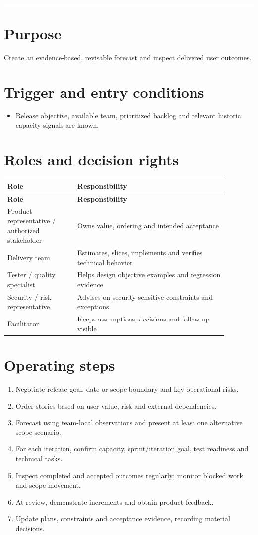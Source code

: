 \documentclass[11pt,letterpaper]{article}
\begin{document}
\tableofcontents\medskip\noindent\rule{\linewidth}{0.4pt}\medskip
\section{Purpose}
Create an evidence-based, revisable forecast and inspect delivered user outcomes.

\section{Trigger and entry conditions}
\begin{itemize}[leftmargin=*,itemsep=2pt]
\item Release objective, available team, prioritized backlog and relevant historic capacity signals are known.
\end{itemize}
\section{Roles and decision rights}
\begin{longtable}{|p{0.28\linewidth}|p{0.60\linewidth}|}\hline
\textbf{Role} & \textbf{Responsibility} \\ \hline\endfirsthead\hline
\textbf{Role} & \textbf{Responsibility} \\ \hline\endhead
Product representative / authorized stakeholder & Owns value, ordering and intended acceptance \\ \hline
Delivery team & Estimates, slices, implements and verifies technical behavior \\ \hline
Tester / quality specialist & Helps design objective examples and regression evidence \\ \hline
Security / risk representative & Advises on security-sensitive constraints and exceptions \\ \hline
Facilitator & Keeps assumptions, decisions and follow-up visible \\ \hline
\end{longtable}
\section{Operating steps}
\begin{enumerate}[leftmargin=*,itemsep=3pt]
\item Negotiate release goal, date or scope boundary and key operational risks.
\item Order stories based on user value, risk and external dependencies.
\item Forecast using team-local observations and present at least one alternative scope scenario.
\item For each iteration, confirm capacity, sprint/iteration goal, test readiness and technical tasks.
\item Inspect completed and accepted outcomes regularly; monitor blocked work and scope movement.
\item At review, demonstrate increments and obtain product feedback.
\item Update plans, constraints and acceptance evidence, recording material decisions.
\end{enumerate}
\end{document}
